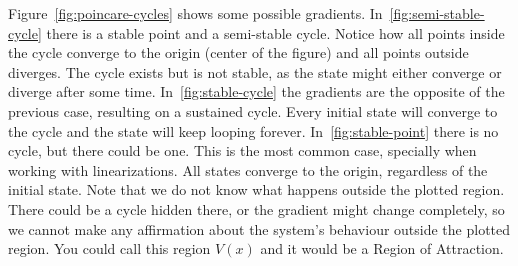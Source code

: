 Figure~\ref{fig:poincare-cycles} shows some possible gradients.
In~\ref{fig:semi-stable-cycle} there is a stable point and a semi-stable cycle.
Notice how all points inside the cycle converge to the origin (center of the
figure) and all points outside diverges. The cycle exists but is not stable, as
the state might either converge or diverge after some time.
In~\ref{fig:stable-cycle} the gradients are the opposite of the previous case,
resulting on a sustained cycle. Every initial state will converge to the cycle
and the state will keep looping forever. In~\ref{fig:stable-point} there is no
cycle, but there could be one. This is the most common case, specially when
working with linearizations. All states converge to the origin, regardless of
the initial state. Note that we do not know what happens outside the plotted
region. There could be a cycle hidden there, or the gradient might change
completely, so we cannot make any affirmation about the system's behaviour
outside the plotted region. You could call this region \(V(x)\) and it would be
a Region of Attraction.


